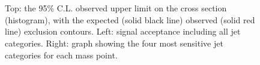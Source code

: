 \newpage
\begin{figure}[h!]
    \begin{center}
         \\
         ~~
         \\
        \caption{Top: the 95\% C.L. observed upper limit on the cross section
            (histogram), with the expected (solid black line) observed
            (solid red line) exclusion contours. Left: signal acceptance
            including all jet categories. Right: graph showing the four
            most sensitive jet categories for each mass point.
        }
        \label{fig:T1qqqqLL:ctau-10}
    \end{center}
\end{figure}

